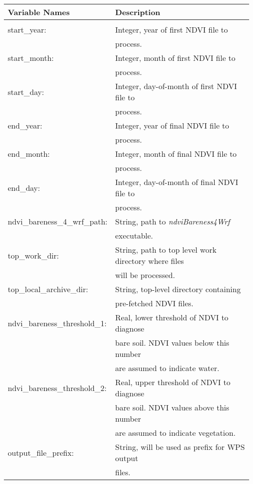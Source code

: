 \documentclass{article}
\begin{document}
\begin{tabular}{|l|l|} \hline
Variable Names          & Description \\ \hline
[SPORT\_MODIS]          & \\ \hline
start\_year:            & Integer, year of first NDVI file to \\
                        & process. \\ \hline
start\_month:           & Integer, month of first NDVI file to \\
                        & process. \\ \hline
start\_day:             & Integer, day-of-month of first NDVI file to \\
                        & process. \\ \hline
end\_year:              & Integer, year of final NDVI file to \\ 
                        & process. \\ \hline
end\_month:             & Integer, month of final NDVI file to \\
                        & process. \\ \hline
end\_day:               & Integer, day-of-month of final NDVI file to \\
                        & process. \\ \hline
ndvi\_bareness\_4\_wrf\_path: & String, path to \textit{ndviBareness4Wrf} \\
                              & executable. \\ \hline
top\_work\_dir: & String, path to top level work directory where files \\
                & will be processed. \\ \hline
top\_local\_archive\_dir: & String, top-level directory containing \\
                          & pre-fetched NDVI files.  \\ \hline
ndvi\_bareness\_threshold\_1: & Real, lower threshold of NDVI to diagnose \\
                              & bare soil.  NDVI values below this number \\
                              & are assumed to indicate water. \\ \hline
ndvi\_bareness\_threshold\_2: & Real, upper threshold of NDVI to diagnose \\
                              & bare soil.  NDVI values above this number \\
                              & are assumed to indicate vegetation. \\ \hline
output\_file\_prefix: & String, will be used as prefix for WPS output \\
                      & files. \\ \hline
\end{tabular} \\
\end{document}
